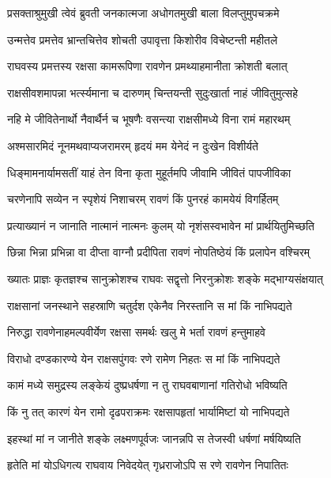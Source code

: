 
\twolineshloka
{प्रसक्ताश्रुमुखी त्वेवं ब्रुवती जनकात्मजा}
{अधोगतमुखी बाला विलप्तुमुपचक्रमे} %

\twolineshloka
{उन्मत्तेव प्रमत्तेव भ्रान्तचित्तेव शोचती}
{उपावृत्ता किशोरीव विचेष्टन्ती महीतले} %

\twolineshloka
{राघवस्य प्रमत्तस्य रक्षसा कामरूपिणा}
{रावणेन प्रमथ्याहमानीता क्रोशती बलात्} %

\twolineshloka
{राक्षसीवशमापन्ना भर्त्स्यमाना च दारुणम्}
{चिन्तयन्ती सुदुःखार्ता नाहं जीवितुमुत्सहे} %

\twolineshloka
{नहि मे जीवितेनार्थो नैवार्थैर्न च भूषणैः}
{वसन्त्या राक्षसीमध्ये विना रामं महारथम्} %

\twolineshloka
{अश्मसारमिदं नूनमथवाप्यजरामरम्}
{हृदयं मम येनेदं न दुःखेन विशीर्यते} %

\twolineshloka
{धिङ्मामनार्यामसतीं याहं तेन विना कृता}
{मुहूर्तमपि जीवामि जीवितं पापजीविका} %

\twolineshloka
{चरणेनापि सव्येन न स्पृशेयं निशाचरम्}
{रावणं किं पुनरहं कामयेयं विगर्हितम्} %

\twolineshloka
{प्रत्याख्यानं न जानाति नात्मानं नात्मनः कुलम्}
{यो नृशंसस्वभावेन मां प्रार्थयितुमिच्छति} %

\twolineshloka
{छिन्ना भिन्ना प्रभिन्ना वा दीप्ता वाग्नौ प्रदीपिता}
{रावणं नोपतिष्ठेयं किं प्रलापेन वश्चिरम्} %

\twolineshloka
{ख्यातः प्राज्ञः कृतज्ञश्च सानुक्रोशश्च राघवः}
{सद्वृत्तो निरनुक्रोशः शङ्के मद्भाग्यसंक्षयात्} %

\twolineshloka
{राक्षसानां जनस्थाने सहस्राणि चतुर्दश}
{एकेनैव निरस्तानि स मां किं नाभिपद्यते} %

\twolineshloka
{निरुद्धा रावणेनाहमल्पवीर्येण रक्षसा}
{समर्थः खलु मे भर्ता रावणं हन्तुमाहवे} %

\twolineshloka
{विराधो दण्डकारण्ये येन राक्षसपुंगवः}
{रणे रामेण निहतः स मां किं नाभिपद्यते} %

\twolineshloka
{कामं मध्ये समुद्रस्य लङ्केयं दुष्प्रधर्षणा}
{न तु राघवबाणानां गतिरोधो भविष्यति} %

\twolineshloka
{किं नु तत् कारणं येन रामो दृढपराक्रमः}
{रक्षसापहृतां भार्यामिष्टां यो नाभिपद्यते} %

\twolineshloka
{इहस्थां मां न जानीते शङ्के लक्ष्मणपूर्वजः}
{जानन्नपि स तेजस्वी धर्षणां मर्षयिष्यति} %

\twolineshloka
{हृतेति मां योऽधिगत्य राघवाय निवेदयेत्}
{गृध्रराजोऽपि स रणे रावणेन निपातितः} %

